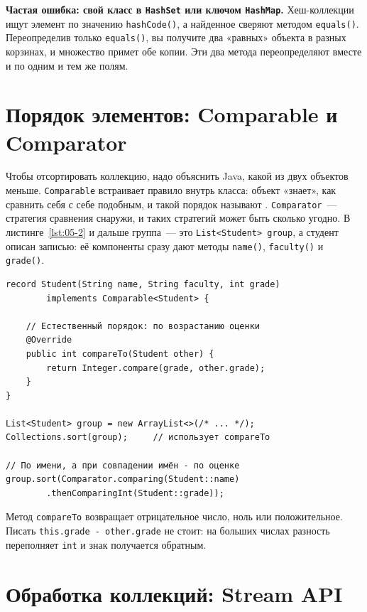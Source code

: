 \begin{oshibka}
\textbf{Частая ошибка: свой класс в \texttt{HashSet} или ключом
\texttt{HashMap}.} Хеш-коллекции ищут элемент по значению \texttt{hashCode()}, а
найденное сверяют методом \texttt{equals()}. Переопределив только
\texttt{equals()}, вы получите два «равных» объекта в разных корзинах, и
множество примет обе копии. Эти два метода переопределяют вместе и по одним и
тем же полям.
\end{oshibka}

\section{Порядок элементов: Comparable и Comparator}

Чтобы отсортировать коллекцию, надо объяснить Java, какой из двух объектов
меньше. \texttt{Comparable} встраивает правило внутрь класса: объект «знает», как
сравнить себя с себе подобным, и такой порядок называют .
\texttt{Comparator}~--- стратегия сравнения снаружи, и таких стратегий может быть
сколько угодно. В листинге~\ref{lst:05-2} и дальше группа~--- это
\texttt{List<Student> group}, а студент описан записью: её компоненты сразу дают
методы \texttt{name()}, \texttt{faculty()} и \texttt{grade()}.

\begin{listing}[H]
\begin{verbatim}
record Student(String name, String faculty, int grade)
        implements Comparable<Student> {

    // Естественный порядок: по возрастанию оценки
    @Override
    public int compareTo(Student other) {
        return Integer.compare(grade, other.grade);
    }
}

List<Student> group = new ArrayList<>(/* ... */);
Collections.sort(group);     // использует compareTo

// По имени, а при совпадении имён - по оценке
group.sort(Comparator.comparing(Student::name)
        .thenComparingInt(Student::grade));
\end{verbatim}
\caption{Естественный порядок и внешняя стратегия сравнения}
\label{lst:05-2}
\end{listing}

Метод \texttt{compareTo} возвращает отрицательное число, ноль или положительное.
Писать \texttt{this.grade - other.grade} не стоит: на больших числах разность
переполняет \texttt{int} и знак получается обратным.

\section{Обработка коллекций: Stream API}

